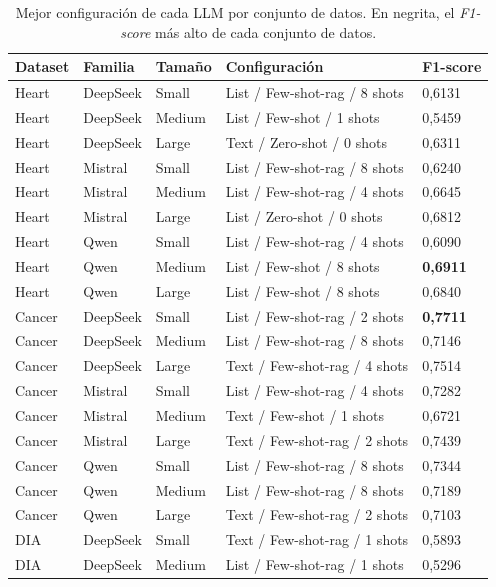 \begin{table}[htbp]
\centering
\caption[Mejor configuración de cada LLM por conjunto de datos]{Mejor configuración de cada LLM por conjunto de datos. En negrita, el \textit{F1-score} más alto de cada conjunto de datos.}
\label{tab:mejor_config_llm}
\begin{tabular}{lllll}
\toprule
Dataset & Familia & Tamaño & Configuración & F1-score \\
\midrule
Heart & DeepSeek & Small & List / Few-shot-rag / 8 shots & 0{,}6131 \\
Heart & DeepSeek & Medium & List / Few-shot / 1 shots & 0{,}5459 \\
Heart & DeepSeek & Large & Text / Zero-shot / 0 shots & 0{,}6311 \\
Heart & Mistral & Small & List / Few-shot-rag / 8 shots & 0{,}6240 \\
Heart & Mistral & Medium & List / Few-shot-rag / 4 shots & 0{,}6645 \\
Heart & Mistral & Large & List / Zero-shot / 0 shots & 0{,}6812 \\
Heart & Qwen & Small & List / Few-shot-rag / 4 shots & 0{,}6090 \\
Heart & Qwen & Medium & List / Few-shot / 8 shots & \textbf{0{,}6911} \\
Heart & Qwen & Large & List / Few-shot / 8 shots & 0{,}6840 \\
Cancer & DeepSeek & Small & List / Few-shot-rag / 2 shots & \textbf{0{,}7711} \\
Cancer & DeepSeek & Medium & List / Few-shot-rag / 8 shots & 0{,}7146 \\
Cancer & DeepSeek & Large & Text / Few-shot-rag / 4 shots & 0{,}7514 \\
Cancer & Mistral & Small & List / Few-shot-rag / 4 shots & 0{,}7282 \\
Cancer & Mistral & Medium & Text / Few-shot / 1 shots & 0{,}6721 \\
Cancer & Mistral & Large & Text / Few-shot-rag / 2 shots & 0{,}7439 \\
Cancer & Qwen & Small & List / Few-shot-rag / 8 shots & 0{,}7344 \\
Cancer & Qwen & Medium & List / Few-shot-rag / 8 shots & 0{,}7189 \\
Cancer & Qwen & Large & Text / Few-shot-rag / 2 shots & 0{,}7103 \\
DIA & DeepSeek & Small & Text / Few-shot-rag / 1 shots & 0{,}5893 \\
DIA & DeepSeek & Medium & List / Few-shot-rag / 1 shots & 0{,}5296 \\

\end{tabular}
\end{table}
